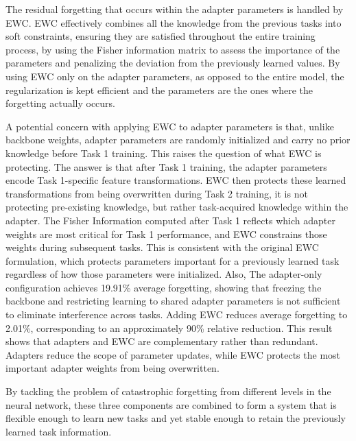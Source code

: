 \documentclass[english, LaM, oneside]{sapthesis}%
\numberwithin{equation}{chapter}
\begin{document}
The residual forgetting that occurs within the adapter parameters is handled by EWC. EWC effectively combines all the knowledge from the previous tasks into soft constraints, ensuring they are satisfied throughout the entire training process, by using the Fisher information matrix to assess the importance of the parameters and penalizing the deviation from the previously learned values. By using EWC only on the adapter parameters, as opposed to the entire model, the regularization is kept efficient and the parameters are the ones where the forgetting actually occurs.

A potential concern with applying EWC to adapter parameters is that, unlike backbone weights, adapter parameters are randomly initialized and carry no prior knowledge before Task 1 training. This raises the question of what EWC is protecting. The answer is that after Task 1 training, the adapter parameters encode Task 1-specific feature transformations. EWC then protects these learned transformations from being overwritten during Task 2 training, it is not protecting pre-existing knowledge, but rather task-acquired knowledge within the adapter. The Fisher Information computed after Task 1 reflects which adapter weights are most critical for Task 1 performance, and EWC constrains those weights during subsequent tasks. This is consistent with the original EWC formulation, which protects parameters important for a previously learned task regardless of how those parameters were initialized. Also, The adapter-only configuration achieves 19.91\% average forgetting, showing that freezing the backbone and restricting learning to shared adapter parameters is not sufficient to eliminate interference across tasks. Adding EWC reduces average forgetting to 2.01\%, corresponding to an approximately 90\% relative reduction. This result shows that adapters and EWC are complementary rather than redundant. Adapters reduce the scope of parameter updates, while EWC protects the most important adapter weights from being overwritten.

By tackling the problem of catastrophic forgetting from different levels in the neural network, these three components are combined to form a system that is flexible enough to learn new tasks and yet stable enough to retain the previously learned task information.
\end{document}
